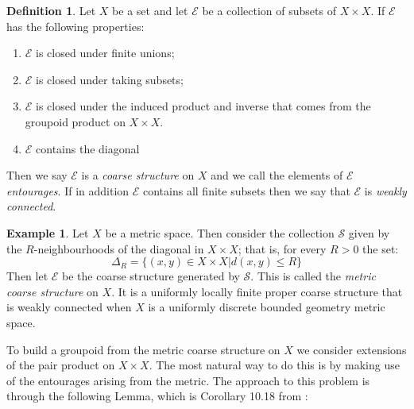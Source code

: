 \documentclass[11pt]{amsart}
\theoremstyle{plain}
\theoremstyle{definition}%
\newtheorem{definition}[theorem]{Definition}%
\newtheorem{example}[theorem]{Example}%
\theoremstyle{remark}%
\begin{document}
\begin{definition}
Let $X$ be a set and let $\mathcal{E}$ be a collection of subsets of $X \times X$. If $\mathcal{E}$ has the following properties:
\begin{enumerate}
\item $\mathcal{E}$ is closed under finite unions;
\item $\mathcal{E}$ is closed under taking subsets;
\item $\mathcal{E}$ is closed under the induced product and inverse that comes from the groupoid product on $X \times X$.
\item $\mathcal{E}$ contains the diagonal
\end{enumerate}
Then we say $\mathcal{E}$ is a \textit{coarse structure} on $X$ and we call the elements of $\mathcal{E}$ \textit{entourages}. If in addition $\mathcal{E}$ contains all finite subsets then we say that $\mathcal{E}$ is \textit{weakly connected}.
\end{definition}

\begin{example}\label{ex:MCS}
Let $X$ be a metric space. Then consider the collection $\mathcal{S}$ given by the $R$-neighbourhoods of the diagonal in $X\times X$; that is, for every $R>0$ the set:
\begin{equation*}
\Delta_{R}=\lbrace (x,y) \in X \times X | d(x,y)\leq R \rbrace
\end{equation*}
Then let $\mathcal{E}$ be the coarse structure generated by $\mathcal{S}$. This is called the \textit{metric coarse structure} on $X$. It is a uniformly locally finite proper coarse structure that is weakly connected when $X$ is a uniformly discrete bounded geometry  metric space.
\end{example}

To build a groupoid from the metric coarse structure on $X$ we consider extensions of the pair product on $X \times X$. The most natural way to do this is by making use of the entourages arising from the metric. The approach to this problem is through the following Lemma, which is Corollary 10.18 from \cite{MR2007488}:
\end{document}
